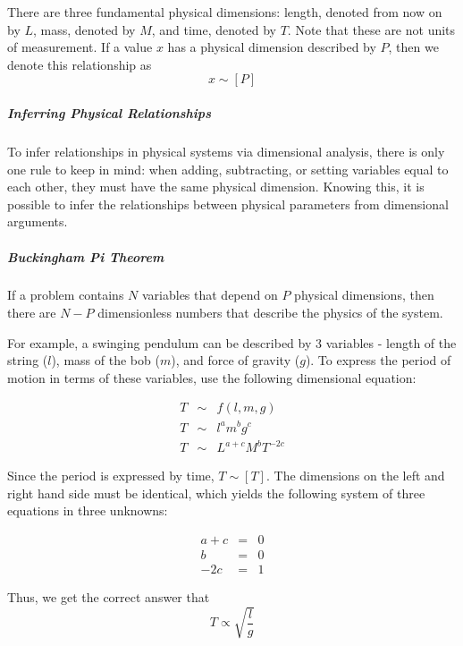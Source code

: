 \documentclass[11pt]{article}
\begin{document}
There are three fundamental physical dimensions: length, denoted from now on by $L$, mass, denoted by $M$, and time, denoted by $T$. Note that these are not units of measurement. If a value $x$ has a physical dimension described by $P$, then we denote this relationship as
\[ x \sim [P]\]

\subparagraph{Inferring Physical Relationships} To infer relationships in physical systems via dimensional analysis, there is only one rule to keep in mind: when adding, subtracting, or setting variables equal to each other, they must have the same physical dimension. Knowing this, it is possible to infer the relationships between physical parameters from dimensional arguments.

\subparagraph{Buckingham Pi Theorem} If a problem contains $N$ variables that depend on $P$ physical dimensions, then there are $N - P$ dimensionless numbers that describe the physics of the system.

For example, a swinging pendulum can be described by 3 variables - length of the string ($l$), mass of the bob ($m$), and force of gravity ($g$). To express the period of motion in terms of these variables, use the following dimensional equation:

\begin{eqnarray}
	T & \sim & f(l, m, g)\\
	T & \sim & l^a m^b g^c\\
	T & \sim & L^{a+c} M^b T^{-2c}
\end{eqnarray}

Since the period is expressed by time, $T \sim [T]$. The dimensions on the left and right hand side must be identical, which yields the following system of three equations in three unknowns:

\begin{eqnarray}
	a + c & = & 0\\
	b & = & 0\\
	-2c & = & 1
\end{eqnarray}

Thus, we get the correct answer that
\begin{equation}
	T \propto \sqrt{\frac{l}{g}}
\end{equation}

%		
%		


\end{document}
